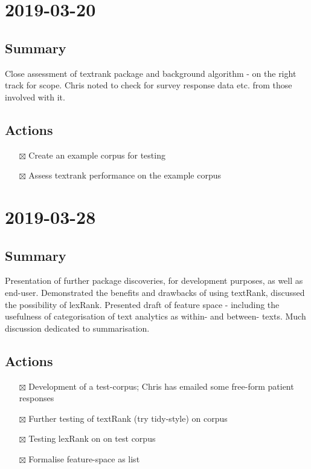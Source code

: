 \documentclass[11pt]{article}
\begin{document}
\section{2019-03-20}
\label{sec:org5b8770c}
\subsection{Summary}
\label{sec:org0f841a7}
Close assessment of textrank package and background algorithm - on the
right track for scope. Chris noted to check for survey response data
etc. from those involved with it.

\subsection{Actions}
\label{sec:orgf4f23dd}

\begin{itemize}
\item[{$\boxtimes$}] Create an example corpus for testing
\item[{$\boxtimes$}] Assess textrank performance on the example corpus
\end{itemize}

\section{2019-03-28}
\label{sec:org45d09cf}
\subsection{Summary}
\label{sec:org40e4774}
Presentation of further package discoveries, for development purposes,
as well as end-user. Demonstrated the benefits and drawbacks of using
textRank, discussed the possibility of lexRank. Presented draft of
feature space - including the usefulness of categorisation of text
analytics as within- and between- texts. Much discussion dedicated to
summarisation.

\subsection{Actions}
\label{sec:orgda6998a}
\begin{itemize}
\item[{$\boxtimes$}] Development of a test-corpus; Chris has emailed some free-form
patient responses
\item[{$\boxtimes$}] Further testing of textRank (try tidy-style) on corpus
\item[{$\boxtimes$}] Testing lexRank on on test corpus
\item[{$\boxtimes$}] Formalise feature-space as list
\end{itemize}
\end{document}
